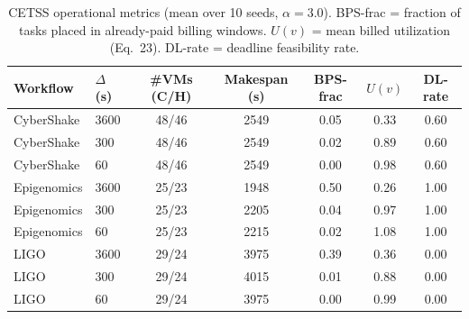 \begin{table}[t]
\centering
\caption{CETSS operational metrics (mean over 10 seeds, $\alpha=3.0$). BPS-frac = fraction of tasks placed in already-paid billing windows. $U(v)$ = mean billed utilization (Eq.~23). DL-rate = deadline feasibility rate.}
\label{tab:ops}
\begin{tabular}{llccccc}
\toprule
Workflow & $\Delta$ (s) & \#VMs (C/H) & Makespan (s) & BPS-frac & $U(v)$ & DL-rate \\
\midrule
CyberShake & 3600 & 48/46 & 2549 & 0.05 & 0.33 & 0.60 \\
CyberShake & 300 & 48/46 & 2549 & 0.02 & 0.89 & 0.60 \\
CyberShake & 60 & 48/46 & 2549 & 0.00 & 0.98 & 0.60 \\
\midrule
Epigenomics & 3600 & 25/23 & 1948 & 0.50 & 0.26 & 1.00 \\
Epigenomics & 300 & 25/23 & 2205 & 0.04 & 0.97 & 1.00 \\
Epigenomics & 60 & 25/23 & 2215 & 0.02 & 1.08 & 1.00 \\
\midrule
LIGO & 3600 & 29/24 & 3975 & 0.39 & 0.36 & 0.00 \\
LIGO & 300 & 29/24 & 4015 & 0.01 & 0.88 & 0.00 \\
LIGO & 60 & 29/24 & 3975 & 0.00 & 0.99 & 0.00 \\
\midrule
\bottomrule
\end{tabular}
\end{table}